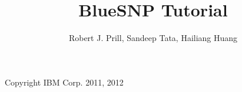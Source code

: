 \documentclass[12pt]{article}
\title{BlueSNP Tutorial}
\author{Robert J. Prill, Sandeep Tata, Hailiang Huang}
\begin{document}
\maketitle

\begin{center}
Copyright IBM Corp. 2011, 2012
\end{center}

\tableofcontents
\newpage








\end{document}
